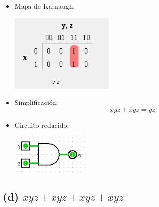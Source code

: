 \begin{itemize}
    \item Mapa de Karnaugh:
\begin{center}
    \includegraphics[width=0.4\textwidth]{recursos/Ejercicio3/mapas/mapa_c).png}
\end{center}

    \item Simplificación: \[ xyz + \overline{x}yz = yz \]

    \item Circuito reducido:
\begin{center}
    \includegraphics[width=0.3\textwidth]{recursos/Ejercicio3/circuito/circuito_c).png}
\end{center}
\end{itemize}

\subsection*{(d) $xy\overline{z} + x\overline{yz} + \overline{x}y\overline{z} + \overline{xyz}$}


